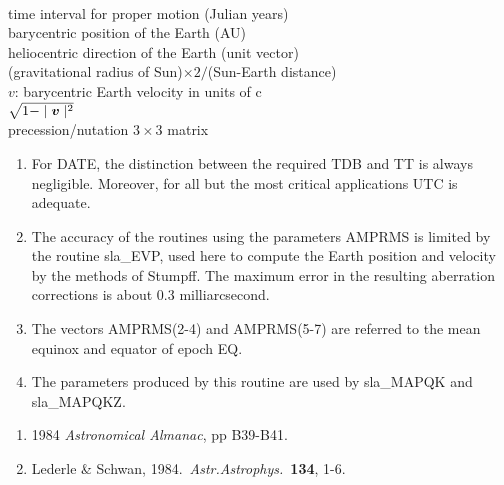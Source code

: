 {
  \\
      {time interval for proper motion (Julian years)} \\
    {barycentric position of the Earth (AU)} \\
    {heliocentric direction of the Earth (unit vector)} \\
      {(gravitational radius of
                      Sun)$\times 2 / $(Sun-Earth distance)} \\
   {\mbox{\boldmath $v$}: barycentric Earth
                                               velocity in units of c} \\
     {$\sqrt{1-\mid\mbox{\boldmath $v$}\mid^2}$} \\
  {precession/nutation $3\times3$ matrix}
}
\notes
{
 \begin{enumerate}
  \item For DATE, the distinction between the required TDB and TT
        is always negligible.  Moreover, for all but the most
        critical applications UTC is adequate.
  \item The accuracy of the routines using the parameters AMPRMS is
        limited by the routine sla\_EVP, used here to compute the
        Earth position and velocity by the methods of Stumpff.
        The maximum error in the resulting aberration corrections is
        about 0.3 milliarcsecond.
  \item The vectors AMPRMS(2-4) and AMPRMS(5-7) are referred to
        the mean equinox and equator of epoch EQ.
  \item The parameters produced by this routine are used by
        sla\_MAPQK and sla\_MAPQKZ.
 \end{enumerate}
}
{
 \begin{enumerate}
  \item 1984 {\it Astronomical Almanac}, pp B39-B41.
  \item Lederle \& Schwan, 1984.\ {\it Astr.Astrophys.}\ {\bf 134}, 1-6.
 \end{enumerate}
}
{
}
